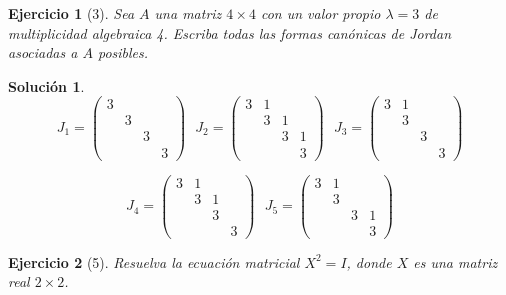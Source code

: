 \documentclass[11pt, a4paper]{article}
\newif\IfInSansMode
\theoremstyle{theorem-style}
\theoremstyle{definition-style}
\newtheorem{ejer}{Ejercicio}[section]
\theoremstyle{remark-style}
\newtheorem*{sol}{Solución}
\theoremstyle{example-style}
\begin{document}
    \begin{ejer}[3] 
        Sea $A$ una matriz $4 \times 4$ con un valor propio $\lambda = 3$ de
        multiplicidad algebraica 4. Escriba todas las formas canónicas de Jordan
        asociadas a $A$ posibles.
    \end{ejer}

    \begin{sol}
        $$J_1 =
        \begin{pmatrix}
            3 & & & \\
              & 3 & & \\
              & & 3 & \\
              & & & 3 
        \end{pmatrix} \ \ \ 
        J_2 =
        \begin{pmatrix}
            3 & 1 & & \\
              & 3 & 1 & \\
              & & 3 & 1 \\
              & & & 3 
        \end{pmatrix} \ \ \
        J_3 =
        \begin{pmatrix}
            3 & 1 & & \\
              & 3 & & \\
              & & 3 & \\
              & & & 3 
        \end{pmatrix}$$

        $$J_4 = 
        \begin{pmatrix}
            3 & 1 & & \\
              & 3 & 1 & \\
              & & 3 & \\
              & & & 3 
        \end{pmatrix} \ \ \
        J_5 =
        \begin{pmatrix}
            3 & 1 & & \\
              & 3 & & \\
              & & 3 & 1 \\
              & & & 3 
        \end{pmatrix}$$
    \end{sol}

    \begin{ejer}[5]
        Resuelva la ecuación matricial $X^2 = I$, donde $X$ es una matriz real $2
        \times 2$.
    \end{ejer}
\end{document}

